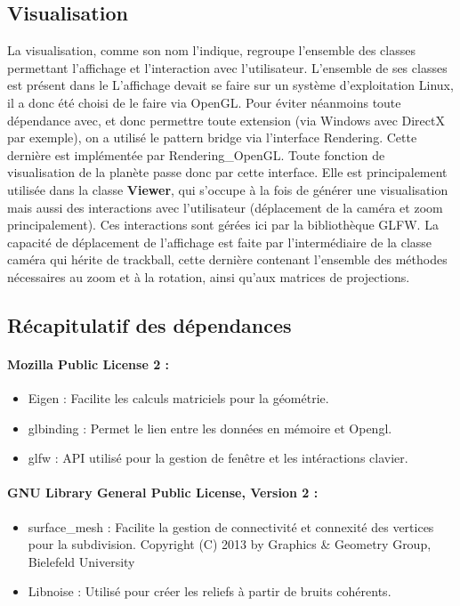\documentclass[a4paper]{article}
\begin{document}
\subsection{Visualisation}


La visualisation, comme son nom l'indique, regroupe l'ensemble des classes permettant l'affichage et l'interaction avec l'utilisateur. L'ensemble de ses classes est présent dans le %
L'affichage devait se faire sur un système d'exploitation Linux, il a donc été choisi de le faire via OpenGL. Pour éviter néanmoins toute dépendance avec, et donc permettre toute extension (via Windows avec DirectX par exemple), on a utilisé le pattern bridge via l'interface Rendering. Cette dernière est implémentée par Rendering\_OpenGL. Toute fonction de visualisation de la planète passe donc par cette interface. Elle est principalement utilisée dans la classe \textbf{Viewer}, qui s'occupe à la fois de générer une visualisation mais aussi des interactions avec l'utilisateur (déplacement de la caméra et zoom principalement). Ces interactions sont gérées ici par la bibliothèque GLFW.
La capacité de déplacement de l'affichage est faite par l'intermédiaire de la classe caméra qui hérite de trackball, cette dernière contenant l'ensemble des méthodes nécessaires au zoom et à la rotation, ainsi qu'aux matrices de projections.

\subsection{Récapitulatif des dépendances}

\paragraph{Mozilla Public License 2 : }
\begin{itemize}
\item Eigen :  
     Facilite les calculs matriciels pour la géométrie. 
 \item glbinding :  
     Permet le lien entre les données en mémoire et Opengl.
\item glfw : 
     API utilisé pour la gestion de fenêtre et les intéractions clavier.
\end{itemize}

\paragraph{GNU Library General Public License, Version 2 : }
\begin{itemize}
\item surface\_mesh :
    Facilite la gestion de connectivité et connexité des vertices pour la subdivision. Copyright (C) 2013 by Graphics \& Geometry Group, Bielefeld University
\item Libnoise :
    Utilisé pour créer les reliefs à partir de bruits cohérents.
\end{itemize}
\end{document}

